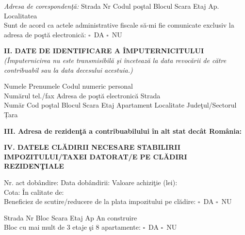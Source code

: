 \documentclass[10pt,a4paper]{article}
\newcommand{\fillline}[1][6cm]{\underline{\hspace{#1}}}
\newcommand{\checkboxempty}{$\square$}
\begin{document}
\vspace{0.2cm}
\textit{Adresa de corespondenţă:} Strada \fillline[5cm] Nr \fillline[1cm] Codul poştal \fillline[2cm] Blocul \fillline[1cm] Scara \fillline[1cm] Etaj \fillline[1cm] Ap. \fillline[1cm] Localitatea \fillline[3cm]\\
Sunt de acord ca actele administrative fiscale să-mi fie comunicate exclusiv la adresa de poştă electronică: \checkboxempty\ DA \quad \checkboxempty\ NU

\vspace{0.4cm}

\textbf{II. DATE DE IDENTIFICARE A ÎMPUTERNICITULUI} \textit{(Împuternicirea nu este transmisibilă şi încetează la data revocării de către contribuabil sau la data decesului acestuia.)}

\vspace{0.2cm}

Numele \fillline[5cm] Prenumele \fillline[5cm] Codul numeric personal \fillline[4cm]\\
Numărul tel./fax \fillline[3cm] Adresa de poştă electronică \fillline[5cm] Strada \fillline[5cm]\\
Număr \fillline[1.5cm] Cod poştal \fillline[2cm] Blocul \fillline[1cm] Scara \fillline[1cm] Etaj \fillline[1cm] Apartament \fillline[1.5cm] Localitate \fillline[3cm] Judeţul/Sectorul \fillline[3cm] Țara \fillline[2cm]

\vspace{0.4cm}

\textbf{III. Adresa de reziden\c{t}ă a contribuabilului în alt stat decât România:} \hrulefill\\
\hrulefill

\vspace{0.4cm}

\textbf{IV. DATELE CLĂDIRII NECESARE STABILIRII IMPOZITULUI/TAXEI DATORAT/E PE CLĂDIRI REZIDENŢIALE}

\vspace{0.2cm}

Nr. act dobândire: \fillline[3cm] Data dobândirii: \fillline[3cm] Valoare achiziţie (lei): \fillline[3cm]\\
Cota: \fillline[2cm] În calitate de: \fillline[4cm]\\
Beneficiez de scutire/reducere de la plata impozitului pe clădire: \checkboxempty\ DA \quad \checkboxempty\ NU

\vspace{0.2cm}

Strada \fillline[4cm] Nr \fillline[1.5cm] Bloc \fillline[1cm] Scara \fillline[1cm] Etaj \fillline[1cm] Ap \fillline[1cm] An construire \fillline[2cm]\\
Bloc cu mai mult de 3 etaje şi 8 apartamente: \checkboxempty\ DA \quad \checkboxempty\ NU
\end{document}
